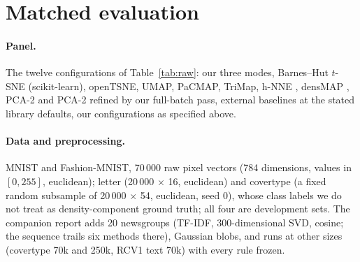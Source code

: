 \documentclass[10pt,twocolumn]{article}
\begin{document}
\section{Matched evaluation}\label{sec:results}
\paragraph{Panel.} The twelve configurations of Table~\ref{tab:raw}: our three modes, Barnes--Hut $t$-SNE
(scikit-learn), openTSNE, UMAP, PaCMAP, TriMap, h-NNE \citep{sarfraz2022hnne}, densMAP \citep{narayan2021densmap},
PCA-2 and PCA-2 refined by our full-batch pass, external baselines at the stated library defaults, our configurations as specified above.

\paragraph{Data and preprocessing.} MNIST and Fashion-MNIST, 70\,000 raw pixel vectors (784 dimensions, values
in $[0, 255]$, euclidean); letter (20\,000 $\times$ 16, euclidean) and covertype (a fixed random subsample of
20\,000 $\times$ 54, euclidean, seed 0), whose class labels we do not treat as density-component ground truth; all
four are development sets. The
companion report adds 20 newsgroups (TF-IDF, 300-dimensional SVD, cosine; the sequence trails six methods there),
Gaussian blobs, and runs at other sizes (covertype 70k and 250k, RCV1 text 70k) with every rule frozen.
\end{document}
